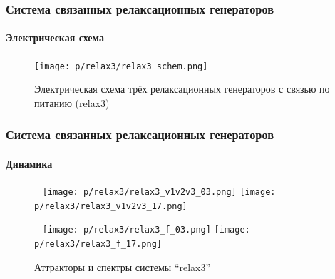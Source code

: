 \documentclass[10pt,utf8]{beamer}
\begin{document}

\begin{frame}
  \frametitle{Система связанных релаксационных генераторов}
  \framesubtitle{Электрическая схема}

  \begin{figure}[h!]
  \begin{center}
    \texttt{[image: p/relax3/relax3\_schem.png]}
  \end{center}
    \caption{Электрическая схема трёх релаксационных генераторов с связью по питанию (relax3)}
  \label{atu:f:relax3_schem}
  \end{figure}

\end{frame}




\begin{frame}
  \frametitle{Система связанных релаксационных генераторов}
  \framesubtitle{Динамика}

  \begin{figure}[h!]
    \centerline{
      {~}\hfill
      \texttt{[image: p/relax3/relax3\_v1v2v3\_03.png]}
      \hfill
      \texttt{[image: p/relax3/relax3\_v1v2v3\_17.png]}
      \hfill{~}
    }
    \centerline{
      {~}\hfill
      \texttt{[image: p/relax3/relax3\_f\_03.png]}
      \hfill
      \texttt{[image: p/relax3/relax3\_f\_17.png]}
      \hfill{~}
    }
    \caption{Аттракторы и спектры системы ``relax3''}
    \label{atu:f:relax3_dyn}
  \end{figure}



\end{frame}



\end{document}
